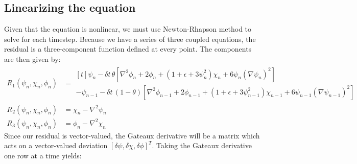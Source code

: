 \documentclass[reqno]{article}
\begin{document}
\subsection{Linearizing the equation}
Given that the equation is nonlinear, we must use Newton-Rhapson method to solve for each timestep.
Because we have a series of three coupled equations, the residual is a three-component function defined at every point.
The components are then given by:
\begin{equation}
    \begin{split}
        R_1(\psi_n, \chi_n, \phi_n)
        &=
        \begin{multlined}[t]
        \psi_n
        - \delta t \, \theta \left[
            \nabla^2 \phi_n
            + 2 \phi_n
            + \left(1 + \epsilon + 3 \psi_n^2 \right) \chi_n
            + 6 \psi_n \left(\nabla \psi_n \right)^2
        \right] \\
        - \psi_{n - 1} 
        - \delta t \, \left(1 - \theta \right) \left[
            \nabla^2 \phi_{n - 1}
            + 2 \phi_{n - 1}
            + \left(1 + \epsilon + 3 \psi_{n - 1}^2 \right) \chi_{n - 1}
            + 6 \psi_{n - 1} \left(\nabla \psi_{n - 1} \right)^2
        \right]
        \end{multlined}\\
        R_2(\psi_n, \chi_n, \phi_n)
        &=
        \chi_n - \nabla^2 \psi_n \\
        R_3(\psi_n, \chi_n, \phi_n)
        &=
        \phi_n - \nabla^2 \chi_n
    \end{split}
\end{equation}
Since our residual is vector-valued, the Gateaux derivative will be a matrix which acts on a vector-valued deviation $\left[ \delta \psi, \delta \chi, \delta \phi \right]^T$.
Taking the Gateaux derivative one row at a time yields:
\end{document}
